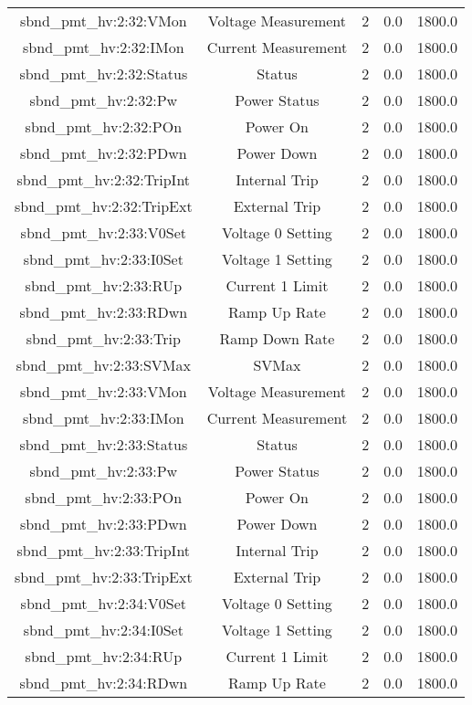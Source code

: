 \begin{center}
\begin{longtable}{c | c c c c }
sbnd\_pmt\_hv:2:32:VMon & Voltage Measurement & 2 & 0.0 & 1800.0\\ 
sbnd\_pmt\_hv:2:32:IMon & Current Measurement & 2 & 0.0 & 1800.0\\ 
sbnd\_pmt\_hv:2:32:Status & Status & 2 & 0.0 & 1800.0\\ 
sbnd\_pmt\_hv:2:32:Pw & Power Status & 2 & 0.0 & 1800.0\\ 
sbnd\_pmt\_hv:2:32:POn & Power On & 2 & 0.0 & 1800.0\\ 
sbnd\_pmt\_hv:2:32:PDwn & Power Down & 2 & 0.0 & 1800.0\\ 
sbnd\_pmt\_hv:2:32:TripInt & Internal Trip & 2 & 0.0 & 1800.0\\ 
sbnd\_pmt\_hv:2:32:TripExt & External Trip & 2 & 0.0 & 1800.0\\ 
sbnd\_pmt\_hv:2:33:V0Set & Voltage 0 Setting & 2 & 0.0 & 1800.0\\ 
sbnd\_pmt\_hv:2:33:I0Set & Voltage 1 Setting & 2 & 0.0 & 1800.0\\ 
sbnd\_pmt\_hv:2:33:RUp & Current 1 Limit & 2 & 0.0 & 1800.0\\ 
sbnd\_pmt\_hv:2:33:RDwn & Ramp Up Rate & 2 & 0.0 & 1800.0\\ 
sbnd\_pmt\_hv:2:33:Trip & Ramp Down Rate & 2 & 0.0 & 1800.0\\ 
sbnd\_pmt\_hv:2:33:SVMax & SVMax & 2 & 0.0 & 1800.0\\ 
sbnd\_pmt\_hv:2:33:VMon & Voltage Measurement & 2 & 0.0 & 1800.0\\ 
sbnd\_pmt\_hv:2:33:IMon & Current Measurement & 2 & 0.0 & 1800.0\\ 
sbnd\_pmt\_hv:2:33:Status & Status & 2 & 0.0 & 1800.0\\ 
sbnd\_pmt\_hv:2:33:Pw & Power Status & 2 & 0.0 & 1800.0\\ 
sbnd\_pmt\_hv:2:33:POn & Power On & 2 & 0.0 & 1800.0\\ 
sbnd\_pmt\_hv:2:33:PDwn & Power Down & 2 & 0.0 & 1800.0\\ 
sbnd\_pmt\_hv:2:33:TripInt & Internal Trip & 2 & 0.0 & 1800.0\\ 
sbnd\_pmt\_hv:2:33:TripExt & External Trip & 2 & 0.0 & 1800.0\\ 
sbnd\_pmt\_hv:2:34:V0Set & Voltage 0 Setting & 2 & 0.0 & 1800.0\\ 
sbnd\_pmt\_hv:2:34:I0Set & Voltage 1 Setting & 2 & 0.0 & 1800.0\\ 
sbnd\_pmt\_hv:2:34:RUp & Current 1 Limit & 2 & 0.0 & 1800.0\\ 
sbnd\_pmt\_hv:2:34:RDwn & Ramp Up Rate & 2 & 0.0 & 1800.0\\ 

\end{longtable}
\end{center}

